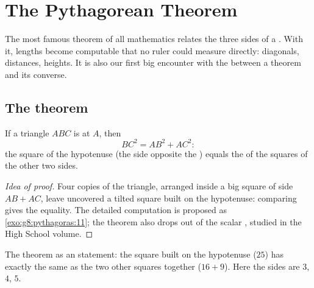 \chapter{The Pythagorean Theorem}\label{ch:g8:pythagoras}

The most famous theorem of all mathematics relates the three sides of
a . With it, lengths become computable that no ruler
could measure directly: diagonals, distances, heights. It is also our
first big encounter with the  between a theorem and its
converse.

\section{The theorem}

\begin{theorem}[Pythagoras]\label{thm:g8:pythagoras:direct}
If a triangle $ABC$ is  at $A$, then
\[
BC^2 = AB^2 + AC^2 :
\]
the square of the hypotenuse (the side opposite the )
equals the  of the squares of the other two sides.
\end{theorem}

\begin{proof}[Idea of proof]
Four copies of the triangle, arranged inside a big square of side
$AB + AC$, leave uncovered a tilted square built on the hypotenuse:
comparing  gives the equality. The detailed computation is
proposed as \cref{exo:g8:pythagoras:11}; the theorem also drops out
of the scalar , studied in the High School volume.
\end{proof}

\begin{omfigure}

{\small The theorem as an  statement: the square built on the
hypotenuse ($25$) has exactly the same  as the two other squares
together ($16 + 9$). Here the sides are $3$, $4$, $5$.}
\end{omfigure}

